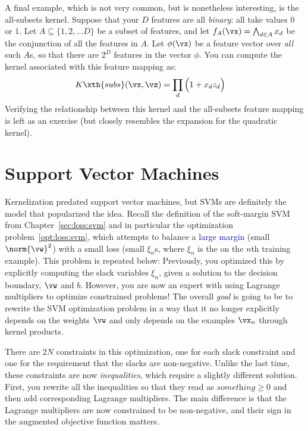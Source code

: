 A final example, which is not very common, but is nonetheless
interesting, is the all-subsets kernel.  Suppose that your $D$
features are all \emph{binary}: all take values $0$ or $1$.  Let $A
\subseteq \{ 1, 2, \dots D \}$ be a subset of features, and let
$f_A(\vx) = \bigwedge_{d \in A} x_d$ be the conjunction of all the
features in $A$.  Let $\phi(\vx)$ be a feature vector over \emph{all}
such $A$s, so that there are $2^D$ features in the vector $\phi$.  You
can compute the kernel associated with this feature mapping as:
%
\begin{align}
K\xth{subs}(\vx,\vz) &= \prod_d \Big( 1 + x_d z_d \Big)
\end{align}
%
Verifying the relationship between this kernel and the all-subsets
feature mapping is left as an exercise (but closely resembles the
expansion for the quadratic kernel).

\section{Support Vector Machines}

Kernelization predated support vector machines, but SVMs are
definitely the model that popularized the idea.  Recall the definition
of the soft-margin SVM from Chapter~\ref{sec:loss:svm} and in
particular the optimization problem~\eqref{opt:loss:svm}, which
attempts to balance a \textcolor{darkblue}{large margin} (small
$\norm{\vw}^2$) with a \textcolor{darkergreen}{small loss} (small
$\xi_n$s, where $\xi_n$ is the  on the $n$th training
example).  This problem is repeated below:
%
%
Previously, you optimized this by explicitly computing the slack
variables $\xi_n$, given a solution to the decision boundary, $\vw$
and $b$.  However, you are now an expert with using Lagrange
multipliers to optimize constrained problems!  The overall \emph{goal}
is going to be to rewrite the SVM optimization problem in a way that
it no longer explicitly depends on the weights $\vw$ and only depends
on the examples $\vx_n$ through kernel products.

There are $2N$ constraints in this optimization, one for each slack
constraint and one for the requirement that the slacks are
non-negative.  Unlike the last time, these constraints are now
\emph{inequalities}, which require a slightly different solution.
First, you rewrite all the inequalities so that they read as
$\textit{something} \geq 0$ and then add corresponding Lagrange
multipliers.  The main difference is that the Lagrange multipliers are
now constrained to be non-negative, and their sign in the augmented
objective function matters.

